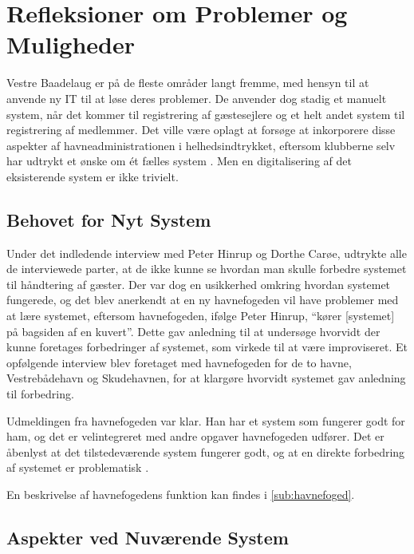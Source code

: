 \section{Refleksioner om Problemer og Muligheder}
\label{sec:refleksioner}

Vestre Baadelaug er på de fleste områder langt fremme, med hensyn til at anvende ny IT til at løse deres problemer. De anvender dog stadig et manuelt system, når det kommer til registrering af gæstesejlere og et helt andet system til registrering af medlemmer. Det ville være oplagt at forsøge at inkorporere disse aspekter af havneadministrationen i helhedsindtrykket, eftersom klubberne selv har udtrykt et ønske om ét fælles system \cite{int_vb_sl}. Men en digitalisering af det eksisterende system er ikke trivielt.

\subsection{Behovet for Nyt System}

Under det indledende interview med Peter Hinrup og Dorthe Carøe, udtrykte alle de interviewede parter, at de ikke kunne se hvordan man skulle forbedre systemet til håndtering af gæster. Der var dog en usikkerhed omkring hvordan systemet fungerede, og det blev anerkendt at en ny havnefogeden vil have problemer med at lære systemet, eftersom havnefogeden, ifølge Peter Hinrup, \enquote{kører [systemet] på bagsiden af en kuvert}. Dette gav anledning til at undersøge hvorvidt der kunne foretages forbedringer af systemet, som virkede til at være improviseret. Et opfølgende interview blev foretaget med havnefogeden for de to havne, Vestrebådehavn og Skudehavnen, for at klargøre hvorvidt systemet gav anledning til forbedring.

Udmeldingen fra havnefogeden var klar. Han har et system som fungerer godt for ham, og det er velintegreret med andre opgaver havnefogeden udfører. Det er åbenlyst at det tilstedeværende system fungerer godt, og at en direkte forbedring af systemet er problematisk \cite{int_hf}. 

En beskrivelse af havnefogedens funktion kan findes i \cref{sub:havnefoged}.

\subsection{Aspekter ved Nuværende System}
\label{sec:aspekter}

